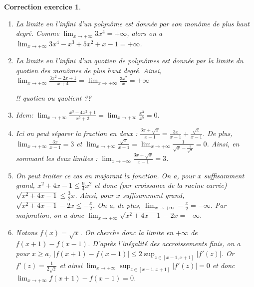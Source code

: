 \documentclass[12pt]{article}
\newtheorem{correction}{\bf Correction exercice}
\newenvironment{cor}{
\begin{correction}\smallskip\normalfont}{\end{correction}
}
\newif\ifcorrige\corrigetrue
\begin{document}
\ifcorrige
\color{magenta}
\begin{cor}
$\qquad$
\begin{enumerate}
\item La limite en l'infini d'un polyn\^ome est donn\'ee par son mon\^ome de plus haut degr\'e.
  Comme $\lim_{x \to + \infty} 3x^4 = + \infty$,
  alors on a $\lim_{x \to + \infty} 3x^4  - x^3 + 5x^2 + x - 1= + \infty$.

\item La limite en l'infini d'un quotien de polyn\^omes est donn\'ee par la limite
  du quotien des mon\^omes de plus haut degr\'e.
  Ainsi, $\lim_{x \to +\infty}\frac{3x^2-2x+1}{x+4} = \lim_{x \to +\infty}\frac{3x^2}{x} = + \infty$

  !! quotien ou quotient ??

\item Idem:
  $\lim_{x \to + \infty} \frac{x^3-4x^2+1}{x^5+2} = \lim_{x \to + \infty} \frac{x^3}{x^5} = 0$.

\item Ici on peut s\'eparer la fraction en deux :
  $\frac{3x+\sqrt{x}}{x-1} = \frac{3x}{x-1} + \frac{\sqrt{x}}{x-1}$.
  De plus, $\lim_{x \to + \infty}\frac{3x}{x-1} = 3$
  et $\lim_{x \to + \infty}\frac{\sqrt{x}}{x-1}
  = \lim_{x \to + \infty}\frac{1}{\sqrt{x}-\frac1{\sqrt{x}}} = 0$.
  Ainsi, en sommant les deux limites : $\lim_{x \to +\infty}\frac{3x+\sqrt{x}}{x-1} = 3$.

\item On peut traiter ce cas en majorant la fonction.
  On a, pour $x$ suffisamment grand, $x^2 + 4x - 1 \leq \frac94 x^2$ et donc
  (par croissance de la racine carr\'ee)
  $\sqrt{x^2 + 4x - 1} \leq \frac32 x$.
  Ainsi, pour $x$ suffisamment grand, $\sqrt{x^2 + 4x - 1} - 2x \leq - \frac{x}2$.
  On a, de plus, $\lim_{x \to +\infty} - \frac{x}2 = -\infty$.
  Par majoration, on a donc $\lim_{x \to +\infty} \sqrt{x^2 + 4x - 1} - 2x = -\infty$.

\item Notons $f(x) = \sqrt{x}$.
  On cherche donc la limite en $+\infty$ de $f(x+1) - f(x-1)$.
  D'apr\`es l'in\'egalit\'e des accroissements finis,
  on a pour $x \geq a$, $| f(x+1) - f(x-1) | \leq 2 \sup_{z \in [x-1, x+1]} |f'(z)|$.
  Or $f'(z) = \frac{1}{2\sqrt{z}}$ et ainsi $\lim_{x \to +\infty} \sup_{z \in [x-1, x+1]} |f'(z)| = 0$
  et donc $\lim_{x \to +\infty} f(x+1) - f(x-1) = 0$.
  
\end{enumerate}
\end{cor}
\color{black}
\fi
\end{document}
